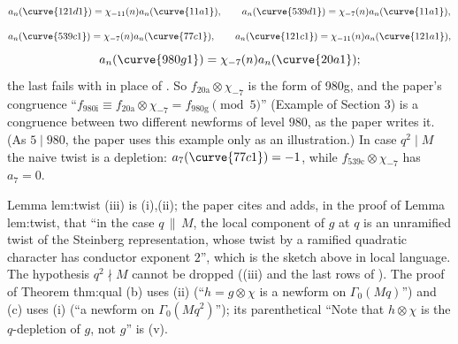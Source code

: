 \begin{example}
\[
a_n(\curve{121d1})=\chi_{-11}(n)a_n(\curve{11a1}),\qquad a_n(\curve{539d1})=\chi_{-7}(n)a_n(\curve{11a1}),
\]
\[
a_n(\curve{539c1})=\chi_{-7}(n)a_n(\curve{77c1}),\qquad a_n(\curve{121c1})=\chi_{-11}(n)a_n(\curve{121a1}),
\]
\[
a_n(\curve{980g1})=\chi_{-7}(n)a_n(\curve{20a1});
\]
the last fails with  in place of . So $f_{\text{20a}}\otimes\chi_{-7}$ is the form of
980g, and the paper's congruence ``$f_{\text{980i}}\equiv f_{\text{20a}}\otimes\chi_{-7}=f_{\text{980g}}\pmod5$'' (Example of Section 3) is a congruence between two different newforms of level $980$, as the paper
writes it. (As $5\mid980$, the paper uses this example only as an illustration.) In case $q^2\mid M$ the naive twist is a depletion: $a_7(\curve{77c1})=-1$, while $f_{\text{539c}}\otimes\chi_{-7}$ has
$a_7=0$.
\end{example}

\begin{paperlink}\label{pl:hecke:atkin-li}
Lemma lem:twist (iii) is (i),(ii); the paper cites \cite[Theorem 3.1]{AtkinLi78} and adds, in the proof of Lemma lem:twist, that ``in the case $q\,\|\,M$, the local
component of $g$ at $q$ is an unramified twist of the Steinberg representation, whose twist by a ramified quadratic character has conductor exponent $2$'', which is the sketch
above in local language. The hypothesis $q^2\nmid M$ cannot be dropped ((iii) and the last rows of ). The proof of Theorem thm:qual (b) uses
(ii) (``$h=g\otimes\chi$ is a newform on $\Gamma_0(Mq)$'') and (c) uses (i) (``a newform on $\Gamma_0(Mq^2)$''); its parenthetical ``Note that $h\otimes\chi$ is the $q$-depletion of $g$, not $g$'' is
(v).
\end{paperlink}

